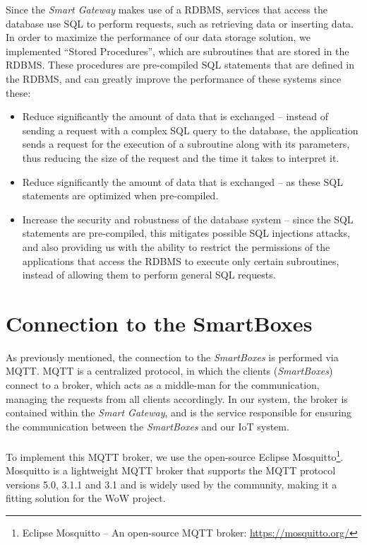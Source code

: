 Since the \textit{Smart Gateway} makes use of a \acs{RDBMS}, services that access the database use \acf{SQL} to perform requests, such as retrieving data or inserting data. In order to maximize the performance of our data storage solution, we implemented ``Stored Procedures'', which are subroutines that are stored in the \acs{RDBMS}. These procedures are pre-compiled \acs{SQL} statements that are defined in the \acs{RDBMS}, and can greatly improve the performance of these systems since these:

\begin{itemize}
    \item Reduce significantly the amount of data that is exchanged -- instead of sending a request with a complex \acs{SQL} query to the database, the application sends a request for the execution of a subroutine along with its parameters, thus reducing the size of the request and the time it takes to interpret it.
    \item Reduce significantly the amount of data that is exchanged -- as these \acs{SQL} statements are optimized when pre-compiled.
    \item Increase the security and robustness of the database system -- since the \acs{SQL} statements are pre-compiled, this mitigates possible \acs{SQL} injections attacks\cite{clarke2012sql}, and also providing us with the ability to restrict the permissions of the applications that access the \acs{RDBMS} to execute only certain subroutines, instead of allowing them to perform general \acs{SQL} requests.
\end{itemize}


\section{Connection to the SmartBoxes}

As previously mentioned, the connection to the \textit{SmartBoxes} is performed via \acs{MQTT}. \acs{MQTT} is a centralized protocol, in which the clients (\textit{SmartBoxes}) connect to a broker, which acts as a middle-man for the communication, managing the requests from all clients accordingly. In our system, the broker is contained within the \textit{Smart Gateway}, and is the service responsible for ensuring the communication between the \textit{SmartBoxes} and our \acs{IoT} system.

\paragraph{} To implement this \acs{MQTT} broker, we use the open-source Eclipse Mosquitto\footnote{Eclipse Mosquitto -- An open-source \acs{MQTT} broker: \url{https://mosquitto.org/}}. Mosquitto is a lightweight \acs{MQTT} broker that supports the \acs{MQTT} protocol versions 5.0, 3.1.1 and 3.1 and is widely used by the community, making it a fitting solution for the \acs{WoW} project.

